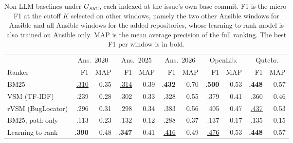 \begin{table}[t]
\centering
\caption{Non-LLM baselines under $G_{SRC}$, each indexed at the issue's own base commit. F1 is the micro-F1 at the cutoff $K$ selected on other windows, namely the two other Ansible windows for Ansible and all Ansible windows for the added repositories, whose learning-to-rank model is also trained on Ansible only. MAP is the mean average precision of the full ranking. The best F1 per window is in bold.}
\label{tab:ir}
\small
\setlength{\tabcolsep}{4pt}
\begin{tabular}{lrrrrrrrrrr}
\toprule
& \multicolumn{2}{c}{Ans.\ 2020} & \multicolumn{2}{c}{Ans.\ 2025} & \multicolumn{2}{c}{Ans.\ 2026} & \multicolumn{2}{c}{OpenLib.} & \multicolumn{2}{c}{Qutebr.} \\
\cmidrule(lr){2-3}\cmidrule(lr){4-5}\cmidrule(lr){6-7}\cmidrule(lr){8-9}\cmidrule(lr){10-11}
Ranker & F1 & MAP & F1 & MAP & F1 & MAP & F1 & MAP & F1 & MAP \\
\midrule
BM25 & \underline{.310} & 0.35 & \underline{.314} & 0.39 & \textbf{.432} & 0.70 & \textbf{.500} & 0.53 & \textbf{.448} & 0.57 \\
VSM (TF-IDF) & .239 & 0.28 & .302 & 0.33 & .328 & 0.55 & .379 & 0.41 & .360 & 0.46 \\
rVSM (BugLocator) & .296 & 0.31 & .298 & 0.34 & .383 & 0.56 & .405 & 0.47 & \underline{.437} & 0.53 \\
BM25, path only & .113 & 0.23 & .132 & 0.12 & .288 & 0.37 & .137 & 0.17 & .135 & 0.15 \\
Learning-to-rank & \textbf{.390} & 0.48 & \textbf{.347} & 0.41 & \underline{.416} & 0.49 & \underline{.476} & 0.53 & \textbf{.448} & 0.57 \\
\bottomrule
\end{tabular}
\end{table}
